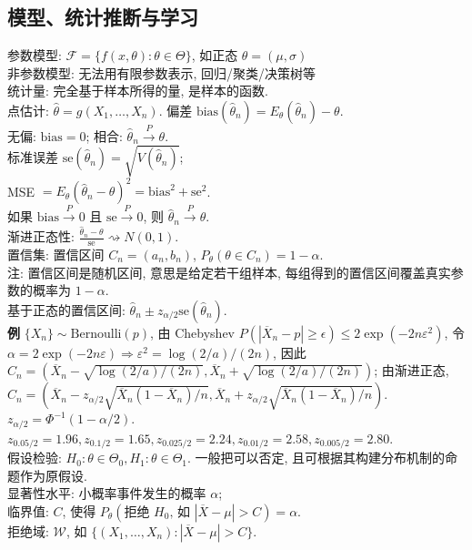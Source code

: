 \documentclass[a4paper, landscape,10pt]{article}
\begin{document}
\begin{multicols}{4}
\section{模型、统计推断与学习}
参数模型: $\mathcal{F}=\{f(x, \theta) : \theta \in \Theta\}$, 如正态 $\theta = (\mu, \sigma)$\\
非参数模型: 无法用有限参数表示, 回归/聚类/决策树等\\
统计量: 完全基于样本所得的量, 是样本的函数. \\
点估计: $\hat \theta = g(X_1, \dots, X_n)$. 
偏差 $\mathrm{bias}(\hat \theta_n) = E_\theta(\hat \theta_n) - \theta$. \\
无偏: $\mathrm{bias} = 0$; 相合: $\hat \theta_n \xrightarrow{P} \theta$. \\
标准误差 $\mathrm{se}(\hat \theta_n) = \sqrt{V(\hat \theta_n)}$; \\
MSE $ = E_\theta(\hat \theta_n - \theta)^2 = \mathrm{bias}^2 + \mathrm{se}^2$. \\
如果 $\mathrm{bias}\xrightarrow{P} 0$ 且 $\mathrm{se}\xrightarrow{P} 0$, 则 $\hat \theta_n \xrightarrow{P} \theta$. \\	
渐进正态性: $\frac{\hat\theta_n - \theta}{\mathrm{se}} \rightsquigarrow N(0, 1).$ \\
置信集: 置信区间 $C_n = (a_n, b_n)$, $P_\theta(\theta \in C_n) = 1 - \alpha$. \\
注: 置信区间是随机区间, 意思是给定若干组样本, 每组得到的置信区间覆盖真实参数的概率为 $1 - \alpha$. \\
基于正态的置信区间: $\hat \theta_n \pm z_{\alpha/2} \mathrm{se}(\hat \theta_n)$. \\
{\bfseries 例} $\{X_n\} \sim \mathrm{Bernoulli}(p)$, 
由 Chebyshev $P(|\overline X_n - p| \geq \epsilon) \leq 2 \exp(-2n\varepsilon^2)$, 令 $\alpha= 2\exp(-2n\varepsilon) \Rightarrow \varepsilon ^ 2 = \log(2/a)/(2n)$, 因此 $C_n = (\overline X_n - \sqrt{\log(2/a)/(2n)}, \overline X_n + \sqrt{\log(2/a)/(2n)})$;
由渐进正态, $C_n =(\overline X_n - z_{\alpha/2} \sqrt{\overline X_n(1 - \overline X_n)/n}, \overline X_n + z_{\alpha/2} \sqrt{\overline X_n(1 - \overline X_n)/n})$. \\
$z_{\alpha/2} = \Phi^{-1}(1 - \alpha / 2)$. $z_{0.05/2} = 1.96, z_{0.1/2} = 1.65, z_{0.025/2} = 2.24, z_{0.01/2}=2.58, z_{0.005/2}=2.80$. \\
假设检验: $H_0: \theta \in \Theta_0, H_1: \theta \in \Theta_1$. 一般把可以否定, 且可根据其构建分布机制的命题作为原假设. \\
显著性水平: 小概率事件发生的概率 $\alpha$; \\
临界值: $C$, 使得 $P_\theta(\text{拒绝 $H_0$, 如 $|\overline X - \mu| > C$}) = \alpha$.\\
拒绝域: $\mathcal{W}$, 如 $\{ (X_1, \dots, X_n) : |\overline X - \mu| > C\}$.\\

\end{multicols}
\end{document}
